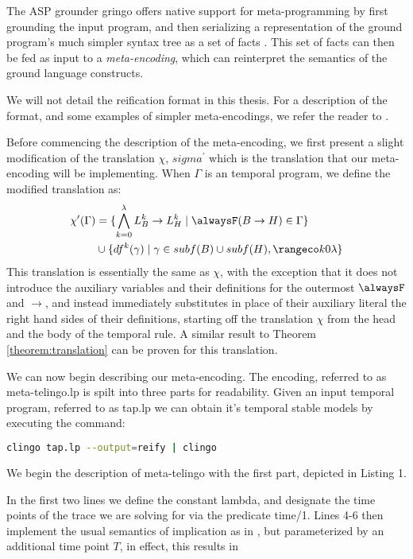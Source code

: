The ASP grounder gringo offers native support for meta-programming by
first grounding the input program, and then serializing a
representation of the ground program's much simpler syntax tree as a
set of facts \cite{karoscwa21a}. This set of facts can then be fed as
input to a \emph{meta-encoding}, which can reinterpret the semantics
of the ground language constructs.

We will not detail the reification format in this thesis. For a
description of the format, and some examples of simpler
meta-encodings, we refer the reader to \cite{karoscwa21a}.

Before commencing the description of the meta-encoding, we first
present a slight modification of the translation $\chi$,
$sigma^{\prime}$ which is the translation that our meta-encoding will
be implementing. When $\Gamma$ is an temporal program, we define the modified
translation as:
\begin{align*}
\chi^{\prime}(\Gamma) & = \{ \bigwedge_{k=0}^{\lambda} L_B^k
\rightarrow L_H^k \mid \alwaysF(B \rightarrow H) \in \Gamma \} \\
& \cup \{ df^k(\gamma) \mid \gamma \in subf(B) \cup subf(H), \kinlambda \}
\end{align*}
This translation is essentially the same as $\chi$, with the
exception that it does not introduce the auxiliary variables and their
definitions for the outermost $\alwaysF$ and $\rightarrow$, and
instead immediately substitutes in place of their auxiliary literal
the right hand sides of their definitions, starting off the
translation $\chi$ from the head and the body of the temporal rule. A similar
result to Theorem \ref{theorem:translation} can be proven for this
translation.

We can now begin describing our meta-encoding. The encoding, referred
to as meta-telingo.lp is spilt into three parts for readability. Given
an input temporal program, referred to as tap.lp we can obtain it's temporal stable
models by executing the command:

\begin{lstlisting}[language=bash,numbers=none]
clingo tap.lp --output=reify | clingo
\end{lstlisting}

 We begin the description of meta-telingo with the first part,
 depicted in Listing 1.

 In the first two lines we define the constant lambda, and designate
 the time points of the trace we are solving for via the predicate
 time/1. Lines 4-6 then implement the usual semantics of implication
 as in \cite{karoscwa21a}, but parameterized by an additional time
 point $T$, in effect, this results in

